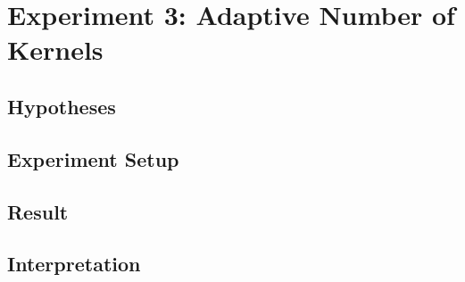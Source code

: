 \documentclass[./\jobname.tex]{subfiles}
\begin{document}
\chapter {Experiment 3: Adaptive Number of Kernels}
\label{chap:experimet_3}

\section{Hypotheses}

\section{Experiment Setup}

\section{Result}

\section{Interpretation}
\end{document}
